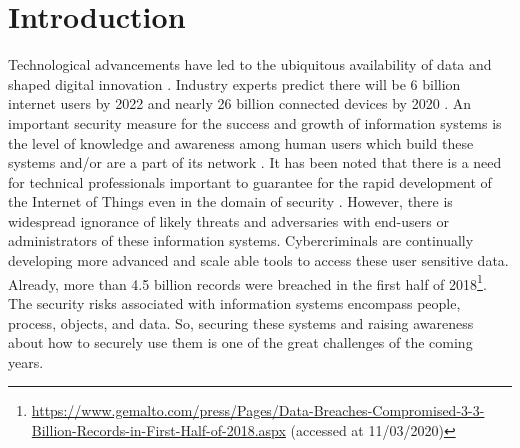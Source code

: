 \documentclass[runningheads]{llncs}
\begin{document}
\section{Introduction}
Technological advancements have led to the ubiquitous availability of data and shaped digital innovation \cite{davenport2013analytics}. Industry experts predict there will be 6 billion internet users by 2022 \cite{cybersecventures2019} and nearly 26 billion connected devices by 2020 \cite{hung2017gartner}. An important security measure for the success and growth of information systems is the level of knowledge and awareness among human users which build these systems and/or are a part of its network \cite{mahmoud2015internet}. It has been noted that there is a need for technical professionals important to guarantee for the rapid development of the Internet of Things even in the domain of security \cite{yu2010exploration}. 
However, there is widespread ignorance of likely threats and adversaries with end-users or administrators of these information systems. %
Cybercriminals are continually developing more advanced and scale able tools to access these user sensitive data. Already, more than 4.5 billion records were breached in the first half of 2018\footnote{\url{https://www.gemalto.com/press/Pages/Data-Breaches-Compromised-3-3-Billion-Records-in-First-Half-of-2018.aspx} (accessed at 11/03/2020)}. The security risks associated with information systems encompass people, process, objects, and data. So, securing these systems and raising awareness about how to securely use them is one of the great challenges of the coming years.  %
\end{document}

